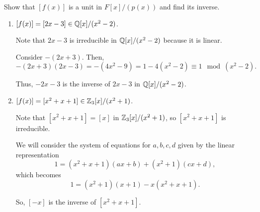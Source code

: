 \documentclass[../hw7]{subfiles}
\begin{document}
\begin{problem}
Show that $[f(x)]$ is a unit in $F[x]/(p(x))$ and find its inverse.
\begin{enumerate}[label=\alph*)]
	\item $[f(x)]=[2x-3]\in \mathbb{Q}[x]/(x^2-2)$.

	      Note that $2x-3$ is irreducible in $\mathbb{Q}[x]/(x^2-2)$ because it is linear.

	      Consider $-(2x+3)$.
	      Then,  \[
		      -(2x+3)(2x-3)=-(4x^2-9)=1-4(x^2-2)\equiv 1 \mod{(x^2-2)}
		      .\]

	      Thus, $-2x-3$ is the inverse of  $2x-3$ in  $\mathbb{Q}[x]/(x^2-2)$.

	\item $[f(x)]=[x^2 + x + 1]\in \mathbb{Z}_3[x]/(x^2+1)$.

	      Note that $[x^2 + x + 1]=[x]$ in $\mathbb{Z}_3[x]/(x^2+1)$, so $[x^2+x+1]$ is irreducible.

	      We will consider the system of equations for $a,b,c,d$ given by the linear representation  \[
		      1=(x^2+x+1)(ax+b)+(x^2+1)(cx+d)
		      ,\] which becomes \[
		      1=(x^2+1)(x+1)-x(x^2+x+1)
		      .\]

	      So, $[-x]$ is the inverse of  $[x^2 + x + 1]$.
\end{enumerate}
\end{problem}
\end{document}

